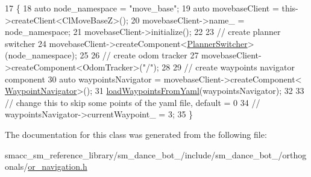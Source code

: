 \begin{DoxyCode}
17     \{
18         \textcolor{keyword}{auto} node\_namespace = \textcolor{stringliteral}{"move\_base"};
19         \textcolor{keyword}{auto} movebaseClient = this->createClient<ClMoveBaseZ>();
20         movebaseClient->name\_ = node\_namespace;
21         movebaseClient->initialize();
22 
23         \textcolor{comment}{// create planner switcher}
24         movebaseClient->createComponent<\hyperlink{classmove__base__z__client_1_1PlannerSwitcher}{PlannerSwitcher}>(node\_namespace);
25 
26         \textcolor{comment}{// create odom tracker}
27         movebaseClient->createComponent<OdomTracker>(\textcolor{stringliteral}{"/"});
28 
29         \textcolor{comment}{// create waypoints navigator component}
30         \textcolor{keyword}{auto} waypointsNavigator = movebaseClient->createComponent<
      \hyperlink{classmove__base__z__client_1_1WaypointNavigator}{WaypointNavigator}>();
31         \hyperlink{classsm__dance__bot__3_1_1OrNavigation_a6a236ec71d26fc0df79658f8e829c518}{loadWaypointsFromYaml}(waypointsNavigator);
32 
33         \textcolor{comment}{// change this to skip some points of the yaml file, default = 0}
34         \textcolor{comment}{// waypointsNavigator->currentWaypoint\_ = 3;}
35     \}
\end{DoxyCode}


The documentation for this class was generated from the following file\+:\begin{DoxyCompactItemize}
\item 
smacc\+\_\+sm\+\_\+reference\+\_\+library/sm\+\_\+dance\+\_\+bot\+\_/include/sm\+\_\+dance\+\_\+bot\+\_/orthogonals/\hyperlink{sm__dance__bot__3_2include_2sm__dance__bot__3_2orthogonals_2or__navigation_8h}{or\+\_\+navigation.\+h}\end{DoxyCompactItemize}
